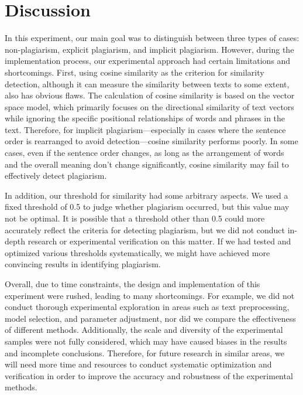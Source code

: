 \section{Discussion}

In this experiment, our main goal was to distinguish between three types of cases: non-plagiarism, explicit plagiarism, and implicit plagiarism. However, during the implementation process, our experimental approach had certain limitations and shortcomings. First, using cosine similarity as the criterion for similarity detection, although it can measure the similarity between texts to some extent, also has obvious flaws. The calculation of cosine similarity is based on the vector space model, which primarily focuses on the directional similarity of text vectors while ignoring the specific positional relationships of words and phrases in the text. Therefore, for implicit plagiarism—especially in cases where the sentence order is rearranged to avoid detection—cosine similarity performs poorly. In some cases, even if the sentence order changes, as long as the arrangement of words and the overall meaning don't change significantly, cosine similarity may fail to effectively detect plagiarism.

In addition, our threshold for similarity had some arbitrary aspects. We used a fixed threshold of 0.5 to judge whether plagiarism occurred, but this value may not be optimal. It is possible that a threshold other than 0.5 could more accurately reflect the criteria for detecting plagiarism, but we did not conduct in-depth research or experimental verification on this matter. If we had tested and optimized various thresholds systematically, we might have achieved more convincing results in identifying plagiarism.

Overall, due to time constraints, the design and implementation of this experiment were rushed, leading to many shortcomings. For example, we did not conduct thorough experimental exploration in areas such as text preprocessing, model selection, and parameter adjustment, nor did we compare the effectiveness of different methods. Additionally, the scale and diversity of the experimental samples were not fully considered, which may have caused biases in the results and incomplete conclusions. Therefore, for future research in similar areas, we will need more time and resources to conduct systematic optimization and verification in order to improve the accuracy and robustness of the experimental methods.